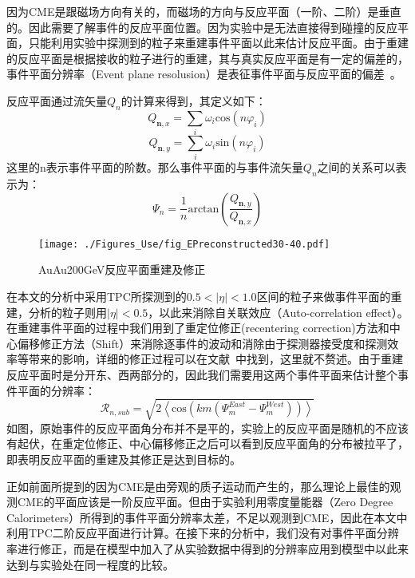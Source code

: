 因为CME是跟磁场方向有关的，而磁场的方向与反应平面（一阶、二阶）是垂直的。因此需要了解事件的反应平面位置。因为实验中是无法直接得到碰撞的反应平面，只能利用实验中探测到的粒子来重建事件平面以此来估计反应平面。由于重建的反应平面是根据接收的粒子进行的重建，其与真实反应平面是有一定的偏差的，事件平面分辨率（Event plane resolusion）是表征事件平面与反应平面的偏差~\cite{Poskanzer:1998yz,Voloshin:2008dg}。

反应平面通过流矢量$Q_{n}$的计算来得到，其定义如下：
\begin{equation}
\label{eq:Qn_x}
Q_{\textbf{n},x} = \sum_{i}\omega_{i}\mathrm{cos}(n\varphi_{i})
\end{equation}
\begin{equation}
\label{eq:Qn_y}
Q_{\textbf{n},y} = \sum_{i}\omega_{i}\mathrm{sin}(n\varphi_{i})
\end{equation}
这里的n表示事件平面的阶数。那么事件平面的与事件流矢量$Q_{n}$之间的关系可以表示为：
\begin{equation}
\label{eq:EventPlane}
\Psi_{n} = \frac{1}{n} \mathrm{arctan}(\frac{Q_{\textbf{n},y}}{Q_{\textbf{n},x}})
\end{equation}
\begin{figure}[htbp]
\centering
\texttt{[image: ./Figures\_Use/fig\_EPreconstructed30-40.pdf]}
\caption{AuAu200GeV反应平面重建及修正}
\label{fig:ep}
\end{figure}
在本文的分析中采用TPC所探测到的$0.5 < |\eta| < 1.0$区间的粒子来做事件平面的重建，分析的粒子则用$|\eta|<0.5$，以此来消除自关联效应（Auto-correlation effect）。在重建事件平面的过程中我们用到了重定位修正(recentering correction)方法和中心偏移修正方法（Shift）来消除逐事件的波动和消除由于探测器接受度和探测效率等带来的影响，详细的修正过程可以在文献~\cite{adamczyk2013elliptic}中找到，这里就不赘述。由于重建反应平面时是分开东、西两部分的，因此我们需要用这两个事件平面来估计整个事件平面的分辨率：
\begin{equation}
\label{eq:Res_Chi_sub}
\mathcal{R}_{n,sub} = \sqrt{2\left\langle \mathrm{cos}(km(\Psi_{m}^{East} - \Psi_{m}^{West})) \right\rangle}
\end{equation}
如图\cite{Fig:ep}，原始事件的反应平面角分布并不是平的，实验上的反应平面是随机的不应该有起伏，在重定位修正、中心偏移修正之后可以看到反应平面角的分布被拉平了，即表明反应平面的重建及其修正是达到目标的。



正如前面所提到的因为CME是由旁观的质子运动而产生的，那么理论上最佳的观测CME的平面应该是一阶反应平面。但由于实验利用零度量能器（Zero Degree Calorimeters）所得到的事件平面分辨率太差，不足以观测到CME，因此在本文中利用TPC二阶反应平面进行计算。在接下来的分析中，我们没有对事件平面分辨率进行修正，而是在模型中加入了从实验数据中得到的分辨率应用到模型中以此来达到与实验处在同一程度的比较。



